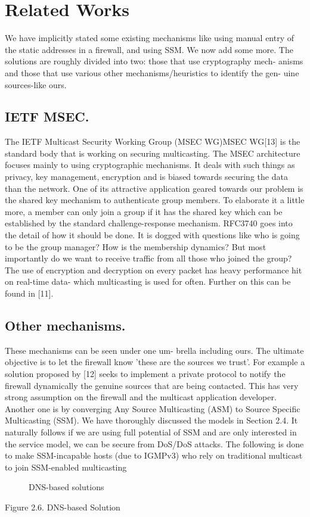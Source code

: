 \documentclass[11pt,left=2cm,bottom=2cm,oneside]{book}
\begin{document}
\section{Related Works}
We have implicitly stated some existing mechanisms like using manual entry of
the static addresses in a firewall, and using SSM. We now add some more.
The solutions are roughly divided into two: those that use cryptography mech-
anisms and those that use various other mechanisms/heuristics to identify the
gen-
uine sources-like ours.
\subsection{IETF MSEC.} The IETF Multicast Security Working Group (MSEC
WG)MSEC WG[13] is the standard body that is working on securing multicasting.
The MSEC architecture focuses mainly to using cryptographic mechanisms. It
deals
with such things as privacy, key management, encryption and is biased towards
securing the data than the network. One of its attractive application geared
towards
our problem is the shared key mechanism to authenticate group members. To
elaborate it a little more, a member can only join a group if it has the
shared key
which can be established by the standard challenge-response mechanism. RFC3740
goes into the detail of how it should be done. It is dogged with questions
like who
is going to be the group manager? How is the membership dynamics? But most
importantly do we want to receive traffic from all those who joined the group?
The use of encryption and decryption on every packet has heavy performance
hit on real-time data- which multicasting is used for often. Further on this
can be
found in [11].
\subsection{Other mechanisms.} These mechanisms can be seen under one um-
brella including ours. The ultimate objective is to let the firewall know
'these are
the sources we trust'. For example a solution proposed by [12] seeks to
implement
a private protocol to notify the firewall dynamically the genuine sources that
are
being contacted. This has very strong assumption on the firewall and the
multicast
application developer.
Another one is by converging Any Source Multicasting (ASM) to Source Specific
Multicasting (SSM). We have thoroughly discussed the models in Section 2.4. It
naturally follows if we are using full potential of SSM and are only
interested in the
service model, we can be secure from DoS/DoS attacks. The following is done to
make SSM-incapable hosts (due to IGMPv3) who rely on traditional multicast to
join SSM-enabled multicasting
\begin{flushleft}\begin{figure}[H]\caption{DNS-based solutions}\end{figure}\end{flushleft}
Figure 2.6. DNS-based Solution
\end{document}
